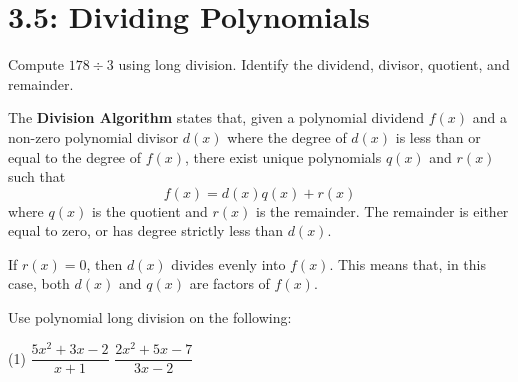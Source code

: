 \documentclass[../mathNotesPreamble]{subfiles}
\providecommand{\relscalefact}{1.4}
\begin{document}
\relscale{\relscalefact}
  \section{3.5: Dividing Polynomials}
    \begin{ex*}
      Compute $178 \div 3$ using long division. Identify the dividend, divisor, quotient, and remainder.
    \end{ex*}
    
    \begin{defn*}
      The \textbf{Division Algorithm} states that, given a polynomial dividend $f(x)$ and a non-zero polynomial divisor $d(x)$ where the degree of $d(x)$ is less than or equal to the degree of $f(x)$, there exist unique polynomials $q(x)$ and $r(x)$ such that 
        \[f(x)=d(x)q(x)+r(x)\]
      where $q(x)$ is the quotient and $r(x)$ is the remainder. The remainder is either equal to zero, or has degree strictly less than $d(x)$.
      
      If $r(x)=0$, then $d(x)$ divides evenly into $f(x)$. This means that, in this case, both $d(x)$ and $q(x)$ are factors of $f(x)$.
    \end{defn*}
    \pagebreak
    
    \begin{ex*}
      Use polynomial long division on the following:
      \begin{extasks}[after-item-skip=\stretch{1}](1)
        \task $\dfrac{5x^2+3x-2}{x+1}$
        \task $\dfrac{2x^2+5x-7}{3x-2}$
      \end{extasks}
    \end{ex*}
    \pagebreak
\end{document}
